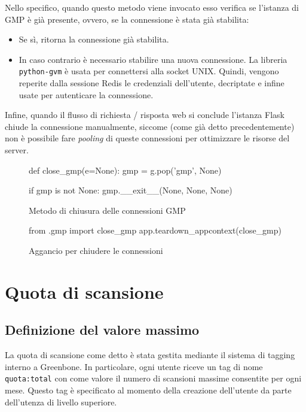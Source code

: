 Nello specifico, quando questo metodo viene invocato esso verifica se l'istanza di GMP è già presente, ovvero, se la connessione è stata già stabilita:
\begin{itemize}
    \item Se sì, ritorna la connessione già stabilita.
    \item In caso contrario è necessario stabilire una nuova connessione. La libreria \texttt{python-gvm} è usata per connettersi alla socket UNIX. Quindi, vengono reperite dalla sessione Redis le credenziali dell'utente, decriptate e infine usate per autenticare la connessione.
\end{itemize}

Infine, quando il flusso di richiesta / risposta web si conclude l'istanza Flask chiude la connessione manualmente, siccome (come già detto precedentemente) non è possibile fare \emph{pooling} di queste connessioni per ottimizzare le risorse del server.

\begin{figure}
\begin{pycode}
def close_gmp(e=None):
    gmp = g.pop('gmp', None)

    if gmp is not None:
        gmp.__exit__(None, None, None)
\end{pycode}
\caption{Metodo di chiusura delle connessioni GMP}
\end{figure}

\begin{figure}
\begin{pycode}
from .gmp import close_gmp
app.teardown_appcontext(close_gmp)
\end{pycode}
\caption{Aggancio per chiudere le connessioni}
\end{figure}

\section{Quota di scansione}
\subsection{Definizione del valore massimo}
La quota di scansione come detto è stata gestita mediante il sistema di tagging interno a Greenbone. In particolare, ogni utente riceve un tag di nome \texttt{quota:total} con come valore il numero di scansioni massime consentite per ogni mese. Questo tag è specificato al momento della creazione dell'utente da parte dell'utenza di livello superiore.

